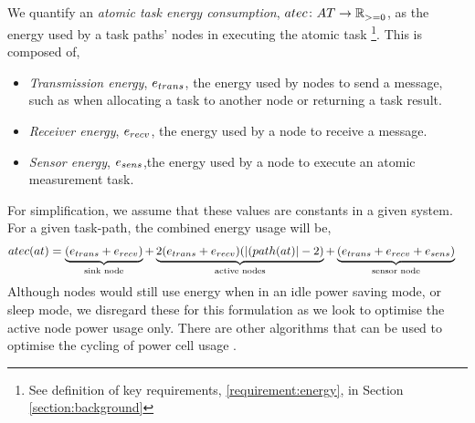 We quantify an \textit{atomic task energy consumption}, $\formalAtomicTaskEnergyConsumption{}{}$, as the energy used by a task paths' nodes in executing the atomic task \footnote{See definition of key requirements, \ref{requirement:energy}, in Section \ref{section:background}}. This is composed of,
 \begin{itemize}
 	\item \textit{Transmission energy}, $e_{trans}$, the energy used by nodes to  send a message, such as when allocating a task to another node or returning a task result. 
 	\item \textit{Receiver energy}, $e_{recv}$, the energy used by a node to receive a message. 
 	 \item \textit{Sensor energy}, $e_{sens}$,the energy used by a node to execute an atomic measurement task.
 \end{itemize}
For simplification, we assume that these values are constants in a given system. For a given task-path, the combined energy usage will be,
\begin{align}
\functionAtomicTaskEnergyConsumptionSignature{}{} 
&= 
\underbrace{(\varTransmissionEnergy{}{} + \varReceiverEnergy{}{})}_{\text{sink node}}
+ \underbrace{
	2 (\varTransmissionEnergy{}{} + \varReceiverEnergy{}{})
 	(\funcSize{(\functionTaskArc{}{}}{} -2)
}_{\text{active nodes}}
+ \underbrace{
	 (
	 	\varTransmissionEnergy{}{}
	 	+ \varReceiverEnergy{}{}
	 	+ \varSensorEnergy{}{}
	 )
 }_{\text{sensor node}}  
\end{align}
Although nodes would still use energy when in an idle power saving mode, or sleep mode, we disregard these for this formulation as we look to optimise the active node power usage only. There are other algorithms that can be used to optimise the cycling of power cell usage \citep{Escolar2014}.

\newcommand{\formalAgentEnergyAvailable}[2]{
	\functionFormal{\mathit{fe}}
	{\setAgents{}{}}
	{\setRealNumbersUnit{}{}}
}
\newcommand{\functionAgentEnergyAvailable}[2]{
	\functionSignature{\mathit{fe}_{\varTime{}{}}}
	{\varAgent{}{}}
}
\newcommand{\functionEnergyVariability}[2]{
	\ifx \\#1\\
	\functionSignature{rev_{\varTime{}{}}}
	{\setAgents{}{}}
	\else
	\functionSignature{rev_{\varTime{}{}}}{#1}
	\fi
}

